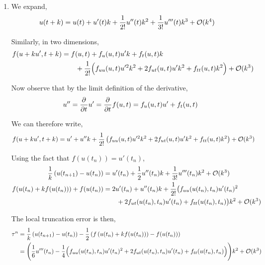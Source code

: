 \documentclass[10pt]{article}
\begin{document}
\begin{solution}[Solution]

\begin{enumerate}[label=(\alph*)]
    \item
        We expand,
        \begin{align*}
            u(t + k) &= u(t) + u'(t)k + \dfrac{1}{2!}u''(t)k^2 + \dfrac{1}{3!}u'''(t)k^3 + \mathcal{O}(k^4)
        \end{align*}

        Similarly, in two dimensions,
        \begin{align*}
            f(u + k u', t+k)
            &= f(u,t) + f_u(u,t)u' k + f_t(u,t)k
            \\& \hspace{2em}+ \dfrac{1}{2!} \Big( f_{uu}(u,t)u'^2k^2 + 2f_{ut}(u,t)u'k^2 + f_{tt}(u,t)k^2 \Big) + \mathcal{O}(k^3)
        \end{align*}

        Now observe that by the limit definition of the derivative,
        \begin{align*}
            u'' = \frac{\partial^{}}{\partial t^{}} u' = \frac{\partial^{}}{\partial t^{}} f(u,t) = f_u(u,t)u' + f_t(u,t)
        \end{align*}

        We can therefore write,
        \begin{align*}
            f(u + k u',t+k)
            &= u' + u'' k + \dfrac{1}{2!} \left( f_{uu}(u,t)u'^2k^2 + 2f_{ut}(u,t)u'k^2 + f_{tt}(u,t)k^2 \right) + \mathcal{O}(k^3)
            \end{align*}

        Using the fact that \( f(u(t_n)) = u'(t_n)  \),
        \begin{align*}
            \dfrac{1}{k} \left( u(t_{n+1}) - u(t_n) \right) &= u'(t_n) + \dfrac{1}{2}u''(t_n)k + \dfrac{1}{3!}u'''(t_n)k^2 + \mathcal{O}(k^3) \\
            f(u(t_n) + kf(u(t_n))) + f(u(t_n)) &=
            2u'(t_n) + u''(t_n) k
            + \dfrac{1}{2!} \big( f_{uu}(u(t_n),t_n)u'(t_n)^2
            \\&\hspace{2em} + 2f_{ut}(u(t_n),t_n)u'(t_n)
            + f_{tt}(u(t_n),t_n)\big)k^2 + \mathcal{O}(k^3)
        \end{align*}


        The local truncation error is then,
        \begin{align*}
            \tau^n &= \dfrac{1}{k} \left( u(t_{n+1}) - u(t_n) \right) - \dfrac{1}{2} \left(f \left( u(t_n) + kf(u(t_n)) \right) - f(u(t_n))\right) \\ &= \Bigg( \dfrac{1}{6} u'''(t_n) - \dfrac{1}{4} \Big( f_{uu}(u(t_n),t_n)u'(t_n)^2 + 2f_{ut}(u(t_n),t_n)u'(t_n)
            + f_{tt}(u(t_n),t_n) \Big)\Bigg)k^2 + \mathcal{O}(k^3)
        \end{align*}


\end{enumerate}
\end{solution}
\end{document}
